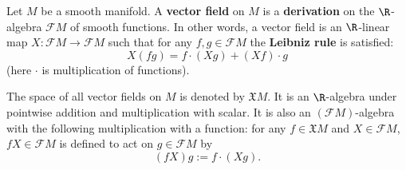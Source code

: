 \begin{definition}
  Let $M$ be a smooth manifold.
  A \textbf{vector field} on $M$ is a \textbf{derivation} on the $\R$-algebra
  $\mathcal{F} M$ of smooth functions.
  In other words, a vector field is an $\R$-linear map
  $X \colon \mathcal{F} M \to \mathcal{F} M$ such that for any
  $f, g \in \mathcal{F} M$ the \textbf{Leibniz rule} is satisfied:
  \begin{equation}
    X(f g) = f \cdot (X g) + (X f) \cdot g
  \end{equation}
  (here $\cdot$ is multiplication of functions).

  The space of all vector fields on $M$ is denoted by $\mathfrak{X} M$.
  It is an $\R$-algebra under pointwise addition and multiplication with scalar.
  It is also an $(\mathcal{F} M)$-algebra with the following multiplication with
  a function: for any $f \in \mathfrak{X} M$ and $X \in \mathcal{F} M$,
  $f X \in \mathcal{F} M$ is defined to act on $g \in \mathcal{F} M$ by
  \begin{equation}
    (f X) g := f \cdot (X g).
  \end{equation}
\end{definition}
